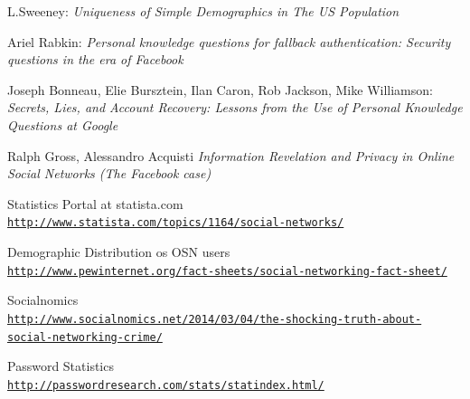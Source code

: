 \documentclass[10pt,conference]{IEEEtran}
\begin{document}
\begin{thebibliography}{1}
L.Sweeney: 
\textit{Uniqueness of Simple Demographics in The US Population}

Ariel Rabkin: 
\textit{Personal knowledge questions for fallback authentication: Security questions in the era of Facebook}

Joseph Bonneau, Elie Bursztein, Ilan Caron, Rob Jackson, Mike Williamson:
\textit{Secrets, Lies, and Account Recovery: Lessons from the Use of Personal Knowledge Questions at Google}

Ralph Gross, Alessandro Acquisti
\textit{Information Revelation and Privacy in Online Social Networks (The Facebook case)}

Statistics Portal at statista.com
\\\texttt{\url{http://www.statista.com/topics/1164/social-networks/}}

Demographic Distribution os OSN users
\\\texttt{\url{http://www.pewinternet.org/fact-sheets/social-networking-fact-sheet/}}

Socialnomics
\\\texttt{\url{http://www.socialnomics.net/2014/03/04/the-shocking-truth-about-social-networking-crime/}}

Password Statistics
\\\texttt{\url{http://passwordresearch.com/stats/statindex.html/}}

\end{thebibliography}
\end{document}
